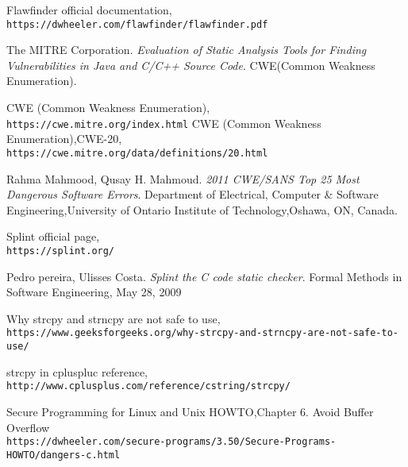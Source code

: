\documentclass[a4paper,12pt]{article}
\begin{document}



\begin{thebibliography}{}

   Flawfinder official documentation,\\\texttt{https://dwheeler.com/flawfinder/flawfinder.pdf}

The MITRE Corporation.
\textit{Evaluation of Static Analysis Tools for Finding Vulnerabilities in Java and C/C++
Source Code}.
CWE(Common
Weakness Enumeration)\cite{CWE}.

  CWE (Common
Weakness Enumeration),\\\texttt{https://cwe.mitre.org/index.html}
  CWE (Common
Weakness Enumeration),CWE-20,\\\texttt{https://cwe.mitre.org/data/definitions/20.html}
  
Rahma Mahmood, Qusay H. Mahmoud.
\textit{2011 CWE/SANS Top 25 Most Dangerous Software Errors}.
Department of Electrical, Computer \& Software Engineering,University of Ontario Institute of Technology,Oshawa, ON, Canada.

 Splint official page,\\\texttt{https://splint.org/}    

Pedro pereira, Ulisses Costa.
\textit{Splint the C code static checker}.
Formal Methods in Software Engineering, May 28, 2009

Why strcpy and strncpy are not safe to use,\\\texttt{https://www.geeksforgeeks.org/why-strcpy-and-strncpy-are-not-safe-to-use/}


strcpy in cpluspluc reference,\\\texttt{http://www.cplusplus.com/reference/cstring/strcpy/}

Secure Programming for Linux and Unix HOWTO,Chapter 6. Avoid Buffer Overflow\\\texttt{https://dwheeler.com/secure-programs/3.50/Secure-Programs-HOWTO/dangers-c.html}

\end{thebibliography}
\end{document}
